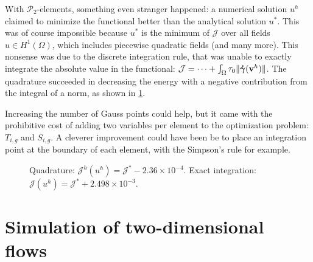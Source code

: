 \documentclass[11 pt]{report}
\begin{document}
\pagebreak
With $\mathcal{P}_2$-elements, something even stranger happened: a numerical solution $u^h$ claimed to minimize the functional better than the analytical solution $u^*$. This was of course impossible because $u^*$ is the minimum of $\mathcal{J}$ over all fields $u \in H^1(\Omega)$, which includes piecewise quadratic fields (and many more). This nonsense was due to the discrete integration rule, that was unable to exactly integrate the absolute value in the functional: $\mathcal{J} = \dots + \int_{\Omega}\tau_0 \|\boldsymbol{\dot \gamma}(\mathbf{v}^h)\|$. The quadrature succeeded in decreasing the energy with a negative contribution from the integral of a norm, as shown in \cref{fig:sensibility_quad}.

Increasing the number of Gauss points could help, but it came with the prohibitive cost of adding two variables per element to the optimization problem: $T_{i,g}$ and $S_{i,g}$. A cleverer improvement could have been be to place an integration point at the boundary of each element, with the Simpson's rule for example.

\begin{figure}[!b]
    \centering
    
    \caption{Quadrature: $\mathcal{J}^h(u^h) = \mathcal{J}^* - 2.36\times 10^{-4}$. Exact integration: $\mathcal{J}(u^h) = \mathcal{J}^* + 2.498\times 10^{-3}$.}
    \label{fig:sensibility_quad}
\end{figure}



\chapter{Simulation of two-dimensional flows}
\label{chap:chap2D}
\end{document}

